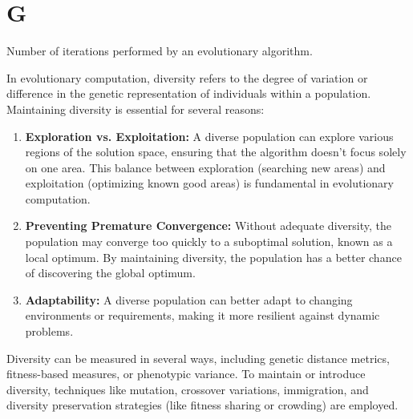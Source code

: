 \section*{G}

  \begin{definition}[Generation]
  \label{def:generation}
    Number of iterations performed by an evolutionary algorithm.
  \end{definition}
  
  \begin{definition}
  \label{def:diversity}
    In evolutionary computation, diversity refers to the degree of variation or 
    difference in the genetic representation of individuals within a 
    population.
    Maintaining diversity is essential for several reasons:

    \begin{enumerate}
      \item \textbf{Exploration vs. Exploitation:} A diverse population can 
        explore various regions of the solution space, ensuring that the 
        algorithm doesn't focus solely on one area.
        This balance between exploration (searching new areas) and exploitation 
        (optimizing known good areas) is fundamental in evolutionary 
        computation.
      \item \textbf{Preventing Premature Convergence:} Without adequate 
        diversity, the population may converge too quickly to a suboptimal 
        solution, known as a local optimum.
        By maintaining diversity, the population has a better chance of 
        discovering the global optimum.
      \item \textbf{Adaptability:} A diverse population can better adapt to 
        changing environments or requirements, making it more resilient against 
        dynamic problems.
    \end{enumerate}

    Diversity can be measured in several ways, including genetic distance 
    metrics, fitness-based measures, or phenotypic variance.
    To maintain or introduce diversity, techniques like mutation, crossover 
    variations, immigration, and diversity preservation strategies (like 
    fitness sharing or crowding) are employed.
  \end{definition}
  
  \begin{definition}[Genotype]
  \label{def:genotype}
    
  \end{definition}